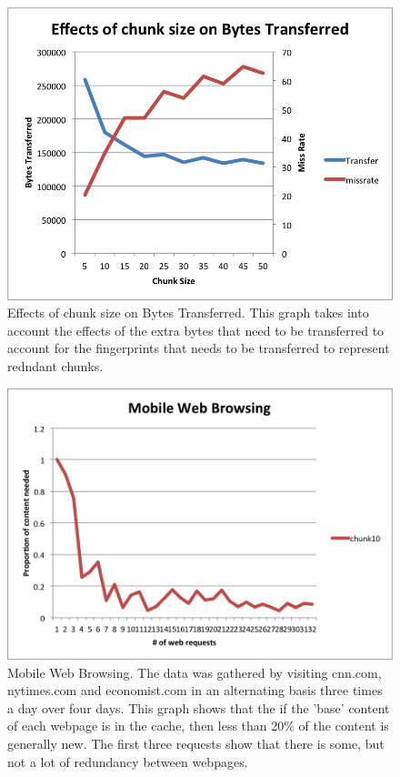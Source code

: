 \begin{figure}[h] 
\centering \includegraphics[scale=0.40]{images/chunksize2.png}
\caption{Effects of chunk size on Bytes Transferred. This graph takes into account the effects of the extra bytes that need to be transferred to account for the fingerprints that needs to be transferred to represent redndant chunks.}
\end{figure}

\begin{figure}[h] 
\centering \includegraphics[scale=0.40]{images/browsing.png}
\caption{Mobile Web Browsing. The data was gathered by visiting cnn.com, nytimes.com and economist.com in an alternating basis three times a day over four days. This graph shows that the if the 'base' content of each webpage is in the cache, then less than 20\% of the content is generally new. The first three requests show that there is some, but not a lot of redundancy between webpages.}
\end{figure}


